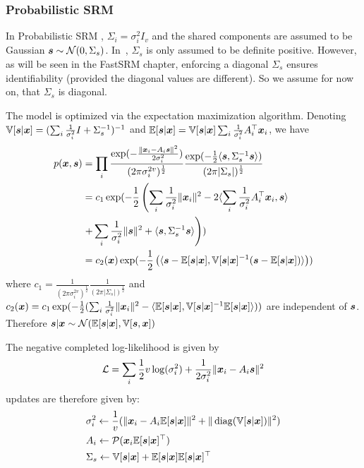 \subsubsection{Probabilistic SRM}
\label{sec:probabilisticsrm}
In Probabilistic SRM , $\Sigma_i=\sigma_i^2 I_v$ and the shared
components are assumed to be Gaussian $\boldsymbol{s} \sim \mathcal{N}(0, \Sigma_s)$.
In~\cite{chen2015reduced}, $\Sigma_s$ is only assumed to be definite positive. However,
as will be seen in the FastSRM chapter, enforcing a diagonal $\Sigma_s$ ensures
identifiability (provided the diagonal values are different). So we assume for
now on, that $\Sigma_s$ is diagonal.

The model is optimized via the expectation maximization algorithm.
Denoting $\mathbb{V}[\boldsymbol{s} | \boldsymbol{x}] = (\sum_i \frac1{\sigma_i^2} I +
\Sigma_s^{-1})^{-1}$ and $\mathbb{E}[\boldsymbol{s} | \boldsymbol{x}] = \mathbb{V}[\boldsymbol{s} | \boldsymbol{x}] \sum_i \frac1{\sigma_i^2}
A_i^{\top}\boldsymbol{x}_i$, we have
\begin{align}
  p(\boldsymbol{x}, \boldsymbol{s}) &= \prod_i \frac{\exp(-\frac{\|\boldsymbol{x}_i - A_i \boldsymbol{s} \|^2}{2 \sigma_i^2})}{(2 \pi \sigma_i^{2v})^{\frac12}} \frac{\exp(-\frac12 \langle \boldsymbol{s} , \Sigma_s^{-1} \boldsymbol{s} \rangle )}{(2 \pi | \Sigma_s|)^{\frac12}} \\
               &= c_1 \exp(-\frac12 \left( \sum_i \frac1{\sigma_i^2}\|\boldsymbol{x}_i\|^2 - 2  \langle \sum_i \frac1{\sigma_i^2} A_i^{\top}\boldsymbol{x}_i, \boldsymbol{s} \rangle \right. \\& \left.+ \sum_i \frac1{\sigma_i^2} \| \boldsymbol{s} \|^2 + \langle \boldsymbol{s}, \Sigma_s^{-1} \boldsymbol{s} \rangle  \right)) \\
               &= c_2(\boldsymbol{x}) \exp(-\frac12 \left( \langle  \boldsymbol{s} - \mathbb{E}[\boldsymbol{s} | \boldsymbol{x}], \mathbb{V}[\boldsymbol{s} | \boldsymbol{x}]^{-1} ( \boldsymbol{s} - \mathbb{E}[\boldsymbol{s} | \boldsymbol{x}])  \rangle \right)) \label{probsrmcompleted}
\end{align}
where $c_1 = \frac1{(2 \pi \sigma_i^{2v})^{\frac12}}\frac1{(2 \pi |
  \Sigma_s|)^{\frac12}}$ and $c_2(\boldsymbol{x}) = c_1 \exp(-\frac12( \sum_i
\frac1{\sigma_i^2}\|\boldsymbol{x}_i\|^2 - \langle  \mathbb{E}[\boldsymbol{s} | \boldsymbol{x}], \mathbb{V}[\boldsymbol{s} | \boldsymbol{x}]^{-1} \mathbb{E}[\boldsymbol{s} | \boldsymbol{x}] \rangle))$ are independent of $\boldsymbol{s}$.
Therefore $\boldsymbol{s}| \boldsymbol{x} \sim \mathcal{N}(\mathbb{E}[\boldsymbol{s} | \boldsymbol{x}], \mathbb{V}[\boldsymbol{s}, \boldsymbol{x}])$

The negative completed log-likelihood is given by
\begin{align}
	\mathcal{L} = \sum_i \frac12 v \log(\sigma_i^2) + \frac1{2 \sigma_i^2} \| \boldsymbol{x}_i - A_i \boldsymbol{s} \|^2
\end{align}
updates are therefore given by:
\begin{align}
&\sigma_i^2 \leftarrow \frac1{v} (\| \boldsymbol{x}_i - A_i \mathbb{E}[\boldsymbol{s}|\boldsymbol{x}]\|^2 + \| \operatorname*{diag}(\mathbb{V}[\boldsymbol{s} | \boldsymbol{x}]) \|^2) \\
  &A_i \leftarrow \mathcal{P}(\boldsymbol{x}_i \mathbb{E}[\boldsymbol{s}|\boldsymbol{x}]^{\top}) \label{eq:psrm:Aiupdate} \\
  & \Sigma_s \leftarrow \mathbb{V}[\boldsymbol{s} | \boldsymbol{x}] + \mathbb{E}[\boldsymbol{s} | \boldsymbol{x}] \mathbb{E}[\boldsymbol{s} | \boldsymbol{x}]^{\top}
\end{align}

